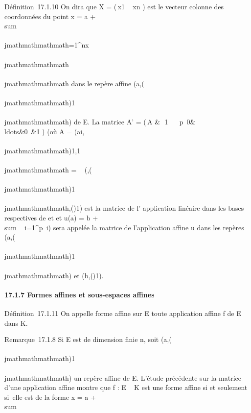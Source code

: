 Définition~17.1.10 On dira que X = \left
(\matrix\,x1
\cr \⋮~
\cr xn 
\right ) est le vecteur colonne des coordonnées du
point x = a + \\sum ~
\\\\jmathmathmathmath=1^nx\\\\jmathmathmathmath\vece\\\\jmathmathmathmath dans
le repère affine
(a,(\vece\\\\jmathmathmathmath)1\leq\\\\jmathmathmathmath\leqn) de E. La
matrice A' = \left
(\matrix\,A
&\matrix\,\alpha~1
\cr \⋮~
\cr \alpha~p \cr
\matrix\,0&\\ldots&0~&1
\right ) (où A = (ai,\\\\jmathmathmathmath)1\leqi\leqp,1\leq\\\\jmathmathmathmath\leqn
= \mathrmMat~
(\vecu,(\vece\\\\jmathmathmathmath)1\leq\\\\jmathmathmathmath\leqn,(\vecfi)1\leqi\leqp)
est la matrice de l' application linéaire \vecu dans
les bases respectives de \overrightarrowE et
\overrightarrowF et u(a) = b
+ \\sum ~
i=1^p\alpha~i\vecfi)
sera appelée la matrice de l'application affine u dans les repères
(a,(\vece\\\\jmathmathmathmath)1\leq\\\\jmathmathmathmath\leqn) et
(b,(\vecfi)1\leqi\leqp).

\paragraph{17.1.7 Formes affines et sous-espaces affines}

Définition~17.1.11 On appelle forme affine sur E toute application
affine f de E dans K.

Remarque~17.1.8 Si E est de dimension finie n, soit
(a,(\vece\\\\jmathmathmathmath)1\leq\\\\jmathmathmathmath\leqn) un repère
affine de E. L'étude précédente sur la matrice d'une application affine
montre que f : E \rightarrow~ K est une forme affine si et seulement si~elle est de
la forme x = a +\ \\sum

